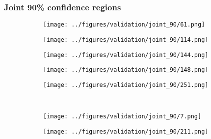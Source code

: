 \subsubsection{Joint 90\% confidence regions}
\begin{figure}[h!]
			\begin{subfigure}[b]{0.03\textwidth} %
		\centering
	\end{subfigure}
	\hspace{0.05cm}
	\begin{subfigure}{0.18\textwidth}
		\centering
		\texttt{[image: ../figures/validation/joint\_90/61.png]}
		\label{fig:1}
	\end{subfigure}
	\begin{subfigure}{0.18\textwidth}
		\centering
		\texttt{[image: ../figures/validation/joint\_90/114.png]}
		\label{fig:1}
	\end{subfigure}
	\begin{subfigure}{0.18\textwidth}
		\centering
		\texttt{[image: ../figures/validation/joint\_90/144.png]}
		\label{fig:1}
	\end{subfigure}
	\begin{subfigure}{0.18\textwidth}
		\centering
		\texttt{[image: ../figures/validation/joint\_90/148.png]}
		\label{fig:1}
	\end{subfigure}
	\begin{subfigure}{0.18\textwidth}
		\centering
		\texttt{[image: ../figures/validation/joint\_90/251.png]}
		\label{fig:1}
	\end{subfigure}
	\vspace{-0.35cm}
	\\
			\begin{subfigure}[b]{0.03\textwidth} %
		\centering
	\end{subfigure}
	\hspace{0.05cm}
	\begin{subfigure}{0.18\textwidth}
		\centering
		\texttt{[image: ../figures/validation/joint\_90/7.png]}
		\label{fig:1}
	\end{subfigure}
	\begin{subfigure}{0.18\textwidth}
		\centering
		\texttt{[image: ../figures/validation/joint\_90/211.png]}
		\label{fig:1}
	\end{subfigure}

\end{figure}
